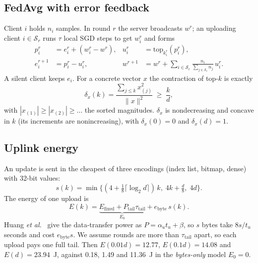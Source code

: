 \documentclass[conference,a4paper]{IEEEtran}
\newcommand{\Ez}{E_0}
\begin{document}
\subsection{FedAvg with error feedback}
Client $i$ holds $n_i$ samples. In round $r$ the server broadcasts $w^r$; an uploading client $i\in\mathcal{S}_r$ runs $\tau$ local SGD steps to get $w_i^r$ and forms
\begin{align}
p_i^r &= e_i^r+(w_i^r-w^r), & u_i^r &= \mathrm{top}_{k_i^r}(p_i^r), \nonumber\\
e_i^{r+1} &= p_i^r-u_i^r, & w^{r+1} &= w^r+\!\!\sum_{i\in\mathcal{S}_r}\!\!\tfrac{n_i}{\sum_{j\in\mathcal{S}_r} n_j}\,u_i^r . \label{eq:ef}
\end{align}
A silent client keeps $e_i$. For a concrete vector $x$ the contraction of top-$k$ is exactly
\begin{equation}
\delta_x(k)=\frac{\sum_{j\le k}x_{(j)}^2}{\|x\|^2}\;\ge\;\frac{k}{d},
\label{eq:delta}
\end{equation}
with $|x_{(1)}|\ge|x_{(2)}|\ge\dots$ the sorted magnitudes. $\delta_x$ is nondecreasing and concave in $k$ (its increments are nonincreasing), with $\delta_x(0)=0$ and $\delta_x(d)=1$.

\subsection{Uplink energy}
An update is sent in the cheapest of three encodings (index list, bitmap, dense) with 32-bit values:
\begin{equation}
s(k)=\min\bigl\{(4+\tfrac{1}{8}\lceil\log_2 d\rceil)\,k,\;4k+\tfrac{d}{8},\;4d\bigr\}.
\label{eq:bytes}
\end{equation}
The energy of one upload is
\begin{equation}
E(k)=\underbrace{E_{\text{fixed}}+P_{\text{tail}}\tau_{\text{tail}}}_{\Ez}+e_{\text{byte}}\,s(k).
\label{eq:energy}
\end{equation}
Huang \emph{et al.}~\cite{huang2012} give the data-transfer power as $P=\alpha_u t_u+\beta$, so $s$ bytes take $8s/t_u$ seconds and cost $e_{\text{byte}}s$. We assume rounds are more than $\tau_{\text{tail}}$ apart, so each upload pays one full tail. Then $E(0.01d)=12.77$, $E(0.1d)=14.08$ and $E(d)=23.94$~J, against 0.18, 1.49 and 11.36~J in the \emph{bytes-only} model $\Ez=0$.
\end{document}
